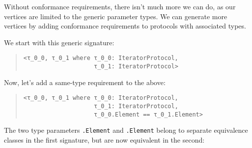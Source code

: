 \documentclass[../generics]{subfiles}
\begin{document}
Without conformance requirements, there isn't much more we can do, as our vertices are limited to the generic parameter types. We can generate more vertices by adding conformance requirements to protocols with associated types.

\begin{example} We start with this generic signature:
\begin{quote}
\begin{verbatim}
<τ_0_0, τ_0_1 where τ_0_0: IteratorProtocol,
                    τ_0_1: IteratorProtocol>
\end{verbatim}
\end{quote}
\begin{quote}
\end{quote}
Now, let's add a same-type requirement to the above:
\begin{quote}
\begin{verbatim}
<τ_0_0, τ_0_1 where τ_0_0: IteratorProtocol,
                    τ_0_1: IteratorProtocol,
                    τ_0_0.Element == τ_0_1.Element>
\end{verbatim}
\end{quote}
The two type parameters \texttt{.Element} and \texttt{.Element} belong to separate equivalence classes in the first signature, but are now equivalent in the second:
\begin{quote}
\end{quote}
\end{example}
\end{document}
